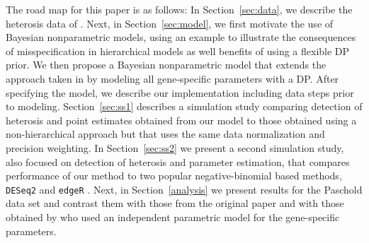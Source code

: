 %
% 
The road map for this paper is as follows: In Section~\ref{sec:data}, we describe the heterosis data of \citet{paschold}. Next, in Section~\ref{sec:model}, we first motivate the use of Bayesian nonparametric models, using an example to illustrate the consequences of misspecification in hierarchical models as well benefits of using a flexible DP prior. We then propose a Bayesian nonparametric model that extends the approach taken in \citet{liu} by modeling all gene-specific parameters with a DP. After specifying the model, we describe our implementation including data steps prior to modeling. Section~\ref{sec:ss1} describes a simulation study comparing detection of heterosis and point estimates obtained from our model to those obtained using a non-hierarchical approach but that uses the same data normalization and precision weighting. In Section~\ref{sec:ss2} we present a second simulation study, also focused on detection of heterosis and parameter estimation, that compares performance of our method to two popular negative-binomial based methods, \texttt{DESeq2} and \texttt{edgeR} \citep{edger2010, deseq2014}. Next, in Section~\ref{analysis} we present results for the Paschold data set and contrast them with those from the original paper \cite{paschold} and with those obtained by \citet{landau} who used an independent parametric model for the gene-specific parameters.


